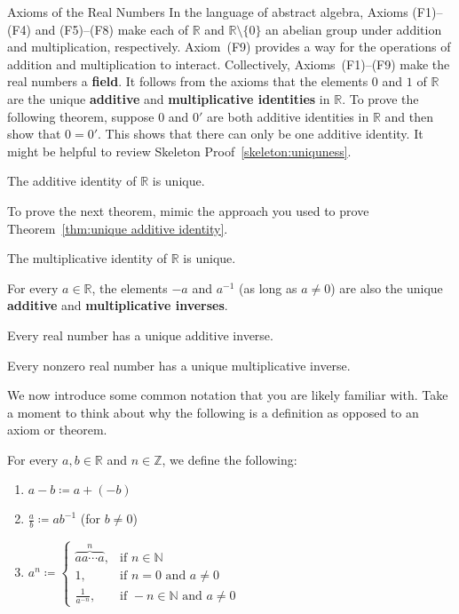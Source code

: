 \begin{section}{Axioms of the Real Numbers}
In the language of abstract algebra, Axioms (F1)--(F4) and (F5)--(F8) make each of $\mathbb{R}$ and $\mathbb{R}\setminus\{0\}$ an abelian group under addition and multiplication, respectively. Axiom~(F9) provides a way for the operations of addition and multiplication to interact.  Collectively, Axioms~(F1)--(F9) make the real numbers a \textbf{field}.  It follows from the axioms that the elements $0$ and $1$ of $\mathbb{R}$ are the unique \textbf{additive} and \textbf{multiplicative identities} in $\mathbb{R}$. To prove the following theorem, suppose $0$ and $0'$ are both additive identities in $\mathbb{R}$ and then show that $0=0'$. This shows that there can only be one additive identity. It might be helpful to review Skeleton Proof~\ref{skeleton:uniquness}. 

\begin{theorem}\label{thm:unique additive identity}
The additive identity of $\mathbb{R}$ is unique.
\end{theorem}

To prove the next theorem, mimic the approach you used to prove Theorem~\ref{thm:unique additive identity}.

\begin{theorem}
The multiplicative identity of $\mathbb{R}$ is unique.
\end{theorem}

For every $a\in\mathbb{R}$, the elements $-a$ and $a^{-1}$ (as long as $a\neq 0$) are also the unique \textbf{additive} and \textbf{multiplicative inverses}. 

\begin{theorem}
Every real number has a unique additive inverse.
\end{theorem}

\begin{theorem}
Every nonzero real number has a unique multiplicative inverse.
\end{theorem}

We now introduce some common notation that you are likely familiar with.  Take a moment to think about why the following is a definition as opposed to an axiom or theorem.

\begin{definition}
For every $a,b\in\mathbb{R}$ and $n\in\mathbb{Z}$, we define the following:
\begin{enumerate}[label=\textrm{(\alph*)}]
\item $a-b\coloneqq a+(-b)$
\item $\displaystyle\frac{a}{b}\coloneqq ab^{-1}$ (for $b\neq 0$)
\item $\displaystyle a^n\coloneqq \begin{cases}
\overbrace{aa\cdots a}^n, &\text{if }n\in \mathbb{N}\\
1, & \text{if }n=0\text{ and }a\neq 0\\
\displaystyle\frac{1}{a^{-n}}, & \text{if }-n\in \mathbb{N}\text{ and }a\neq 0
\end{cases}$
\end{enumerate}
\end{definition}


\end{section}
